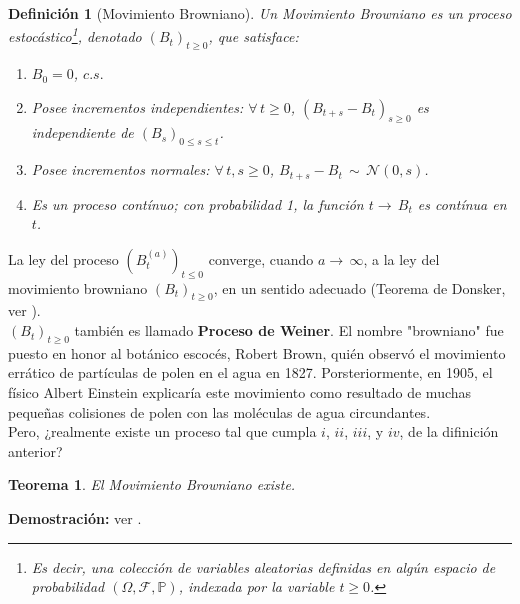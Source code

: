 \documentclass[a4paper]{article}
\newcommand{\prob}{\mathbb{P}}
\newtheorem{definicion}{Definición}
\newtheorem{teorema}{Teorema}
\numberwithin{equation}{subsection}
\begin{document}
\begin{definicion}[Movimiento Browniano] Un Movimiento Browniano es un proceso estocástico\footnote{Es decir, una colección de variables aleatorias definidas en algún espacio de probabilidad $(\Omega,\mathcal{F},\prob)$, indexada por la variable $t\geq 0$.}, denotado $(B_t)_{t\geq 0}$, que satisface:
\begin{enumerate}
    \item[i.] $B_0 = 0$, $c.s.$
    \item[ii.] Posee incrementos independientes: $\forall\, t\geq 0$, $(B_{t+s}-B_t)_{s\geq 0}$ es independiente de $(B_s)_{0\leq s\leq t}$.
    \item[iii.] Posee incrementos normales: $\forall\, t,s\geq 0$, $B_{t+s}-B_{t}\,\sim\,\mathcal{N}(0,s)$.
    \item[iv.] Es un proceso contínuo; con probabilidad 1, la función $t\rightarrow\,B_t$ es contínua en $t$.
\end{enumerate}
\end{definicion}

La ley del proceso $(B_t^{(a)})_{t\leq 0}$ converge, cuando $a\rightarrow\,\infty$, a la ley del movimiento browniano $(B_t)_{t\geq 0}$, en un sentido adecuado (Teorema de Donsker, ver \cite[cap.2, Teo.4.2]{Kara}).\\ \newline $(B_t)_{t\geq 0}$ también es llamado \textbf{Proceso de Weiner}. El nombre "browniano" fue puesto en honor al botánico escocés, Robert Brown, quién observó el movimiento errático de partículas de polen en el agua en 1827. Porsteriormente, en 1905, el físico Albert Einstein explicaría este movimiento como resultado  de muchas pequeñas colisiones de polen con las moléculas de agua circundantes.\\ \newline
Pero, ¿realmente existe un proceso tal que cumpla $i$, $ii$, $iii$, y $iv$, de la difinición anterior?
\begin{teorema}
El Movimiento Browniano existe.
\end{teorema}
\textbf{Demostración: }ver \cite[cap. 2]{Kara}.\\ \newline
\end{document}
